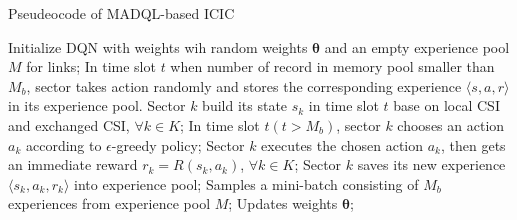 \documentclass{article}
\begin{document}
\renewcommand{\algorithmicrequire}{\textbf{Input:}}  %
\renewcommand{\algorithmicensure}{\textbf{Output:}} %
\begin{algorithm}[h]
	\caption{Pseudeocode of MADQL-based ICIC} 
	\label{alg}
	\begin{algorithmic}[1]
		\State Initialize DQN with weights wih random weights $\bm{\theta}$ and an empty experience pool $M$ for links;
		\State In time slot $t$ when number of record in memory pool smaller than $M_b$, sector takes action randomly and stores the corresponding experience $\langle s, a, r \rangle$ in its experience pool.
		\Repeat
		\State Sector $k$ build its state $s_k$ in time slot $t$ base on local CSI and exchanged CSI, $\forall k \in K$;
		\State In time slot $t(t>M_b)$, sector $k$ chooses an action $a_k$ according to $\epsilon$-greedy policy; 
		\State Sector $k$ executes the chosen action $a_k$, then gets an immediate reward $r_k=R(s_k, a_k)$, $\forall k \in K$;
		\State Sector $k$ saves its new experience $\langle s_k, a_k, r_k \rangle$ into experience pool;
		\State Samples a mini-batch consisting of $M_b$ experiences from experience pool $M$;
		\State Updates weights $\bm{\theta}$;
	\end{algorithmic}
\end{algorithm}
\end{document}
